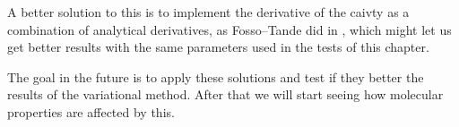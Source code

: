 \documentclass[../master_thesis.tex]{subfiles}
\begin{document}
A better solution to this is to implement the derivative of the caivty as
a combination of analytical derivatives, as Fosso--Tande did in \cite{FossoTande:2013ka}, which
might let us get better results with the same parameters used in the tests of this chapter.

The goal in the future is to apply these solutions and test if they better the
results of the variational method. After that we will start seeing how molecular properties
are affected by this.



\biblio
\end{document}
